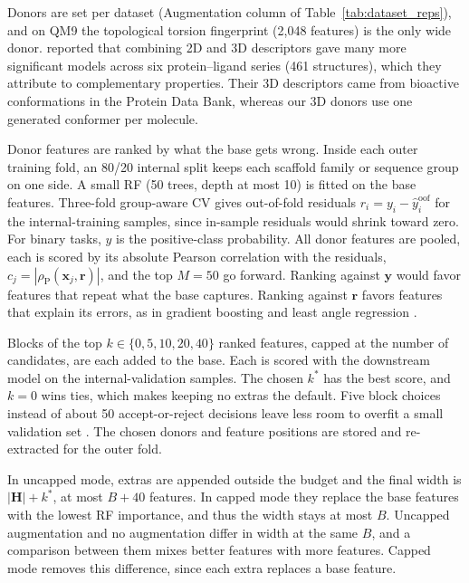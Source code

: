 \label{app:add:augmentation}
Donors are set per dataset (Augmentation column of Table~\ref{tab:dataset_reps}), and on QM9 the topological torsion fingerprint (2,048 features) is the only wide donor. \citet{Bahia2023} reported that combining 2D and 3D descriptors gave many more significant models across six protein--ligand series (461 structures), which they attribute to complementary properties. Their 3D descriptors came from bioactive conformations in the Protein Data Bank, whereas our 3D donors use one generated conformer per molecule.

Donor features are ranked by what the base gets wrong. Inside each outer training fold, an 80/20 internal split keeps each scaffold family or sequence group on one side. A small RF (50 trees, depth at most 10) is fitted on the base features. Three-fold group-aware CV gives out-of-fold residuals $r_i = y_i - \hat{y}^{\mathrm{oof}}_i$ for the internal-training samples, since in-sample residuals would shrink toward zero. For binary tasks, $\hat{y}$ is the positive-class probability. All donor features are pooled, each is scored by its absolute Pearson correlation with the residuals, $c_j = |\rho_{\mathrm{P}}(\mathbf{x}_j, \mathbf{r})|$, and the top $M = 50$ go forward. Ranking against $\mathbf{y}$ would favor features that repeat what the base captures. Ranking against $\mathbf{r}$ favors features that explain its errors, as in gradient boosting \citep{friedman2001greedy} and least angle regression \citep{efron2004lars}.

Blocks of the top $k \in \{0, 5, 10, 20, 40\}$ ranked features, capped at the number of candidates, are each added to the base. Each is scored with the downstream model on the internal-validation samples. The chosen $k^*$ has the best score, and $k=0$ wins ties, which makes keeping no extras the default. Five block choices instead of about 50 accept-or-reject decisions leave less room to overfit a small validation set \citep{Cawley2010}. The chosen donors and feature positions are stored and re-extracted for the outer fold.

In uncapped mode, extras are appended outside the budget and the final width is $|\mathbf{H}| + k^*$, at most $B + 40$ features. In capped mode they replace the base features with the lowest RF importance, and thus the width stays at most $B$. Uncapped augmentation and no augmentation differ in width at the same $B$, and a comparison between them mixes better features with more features. Capped mode removes this difference, since each extra replaces a base feature.

